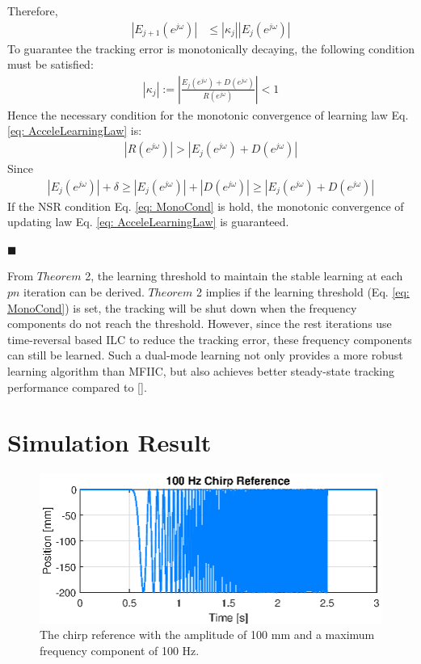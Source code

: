 \documentclass[a4paper, 12pt, twoside, openright]{mythesis}
\begin{document}
Therefore, 
\begin{align}
|E_{j+1}(e^{j\omega})|&\leq|\kappa_j||E_{j}(e^{j\omega})|
\end{align}
To guarantee the tracking error is monotonically decaying, the following condition must be satisfied:
\begin{align}
|\kappa_j|:=|\frac{E_j(e^{j\omega})+D(e^{j\omega})}{R(e^{j\omega})}|<1
\end{align}
Hence the necessary condition for the monotonic convergence of learning law Eq. \ref{eq: AcceleLearningLaw} is:
\begin{align}
|R(e^{j\omega})|>|E_j(e^{j\omega})+D(e^{j\omega})|
\end{align}
Since 
\begin{align}
|E_j(e^{j\omega})|+\delta \geq|E_j(e^{j\omega})|+|D(e^{j\omega})|\geq|E_j(e^{j\omega})+D(e^{j\omega})|
\end{align}
If the NSR condition Eq. \ref{eq: MonoCond} is hold, the monotonic convergence of updating law Eq. \ref{eq: AcceleLearningLaw} is guaranteed. 

\hfill$\blacksquare$



From $Theorem$ 2, the learning threshold to maintain the stable learning at each $pn$ iteration can be derived. $Theorem$ 2 implies if the learning threshold (Eq. \ref{eq: MonoCond}) is set, the tracking will be shut down when the frequency components do not reach the threshold. However, since the rest iterations use time-reversal based ILC to reduce the tracking error, these frequency components can still be learned. Such a dual-mode learning not only provides a more robust learning algorithm than MFIIC, but also achieves better steady-state tracking performance compared to [\cite{de2019data}]. 





\section{Simulation Result}
\label{sec: Simulation Result}

\begin{figure}[t]
 	\begin{center}
 	\includegraphics[width=1\linewidth]{image/ChirpRef.eps}
 	\caption{The chirp reference with the amplitude of 100 mm and a maximum frequency component of 100 Hz.}
 	\label{fig:Reference}
 	\end{center}
\end{figure}
\end{document}
